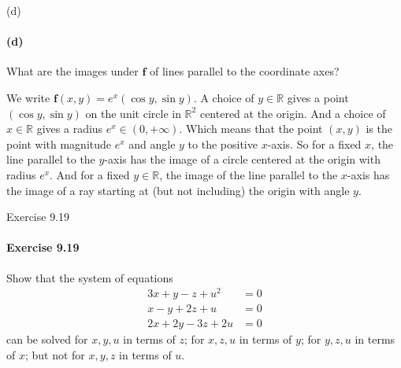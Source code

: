 \documentclass[12pt]{article}
\newenvironment{fullbox}{\begin{lrbox}{\savefullbox}\begin{minipage}{\dimexpr\textwidth-2\fboxsep\relax}}{\end{minipage}\end{lrbox}\begin{center}\framebox[\textwidth]{\usebox{\savefullbox}}\end{center}}
\newenvironment{pbox}[1][]{\begin{fullbox}\ifx#1\empty\else\paragraph{#1}\fi}{\end{fullbox}}
\theoremstyle{definition}
\newcommand{\R}{\mathbb{R}}
\newcommand{\f}{\mathbf{f}}
\begin{document}
\begin{pbox}[(d)]
    What are the images under $\f$ of lines parallel to the coordinate axes?
\end{pbox}

We write $\f(x, y) = e^x(\cos y, \sin y)$. A choice of $y \in \R$ gives a point $(\cos y, \sin y)$ on the unit circle in $\R^2$ centered at the origin. And a choice of $x \in \R$ gives a radius $e^x \in (0, + \infty)$. Which means that the point $(x, y)$ is the point with magnitude $e^x$ and angle $y$ to the positive $x$-axis. So for a fixed $x$, the line parallel to the $y$-axis has the image of a circle centered at the origin with radius $e^x$. And for a fixed $y \in \R$, the image of the line parallel to the $x$-axis has the image of a ray starting at (but not including) the origin with angle $y$.


\newpage
\begin{pbox}[Exercise 9.19]
    Show that the system of equations
    \begin{align*}
        3x + y - z + u^2 &= 0 \\
        x - y + 2z + u &= 0 \\
        2x + 2y - 3z + 2u &= 0
    \end{align*}
    can be solved for $x, y, u$ in terms of $z$; for $x, z, u$ in terms of $y$; for $y, z, u$ in terms of $x$; but not for $x, y, z$ in terms of $u$.
\end{pbox}
\end{document}
